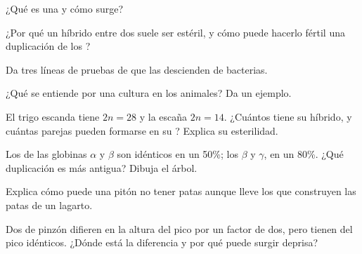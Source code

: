 \begin{exercise}[$\star$]\label{exo:g12:diversification-of-life:2}
¿Qué es una  y cómo surge?
\end{exercise}

\begin{exercise}[$\star$]\label{exo:g12:diversification-of-life:3}
¿Por qué un híbrido entre dos  suele ser estéril, y cómo puede
hacerlo fértil una duplicación de los ?
\end{exercise}

\begin{exercise}[$\star$]\label{exo:g12:diversification-of-life:4}
Da tres líneas de pruebas de que las  descienden de
bacterias.
\end{exercise}

\begin{exercise}[$\star$]\label{exo:g12:diversification-of-life:5}
¿Qué se entiende por una cultura en los animales? Da un ejemplo.
\end{exercise}

\begin{exercise}[$\star\star$]\label{exo:g12:diversification-of-life:6}
El trigo escanda tiene $2n = 28$ y la escaña $2n = 14$. ¿Cuántos
 tiene su híbrido, y cuántas parejas pueden formarse en su
? Explica su esterilidad.
\end{exercise}

\begin{exercise}[$\star\star$]\label{exo:g12:diversification-of-life:7}
Los  de las globinas $\alpha$ y $\beta$ son idénticos en un 50\%;
los  $\beta$ y $\gamma$, en un 80\%. ¿Qué duplicación es más
antigua? Dibuja el árbol.
\end{exercise}

\begin{exercise}[$\star\star$]\label{exo:g12:diversification-of-life:8}
Explica cómo puede una pitón no tener patas aunque lleve los  que
construyen las patas de un lagarto.
\end{exercise}

\begin{exercise}[$\star\star$]\label{exo:g12:diversification-of-life:9}
Dos  de pinzón difieren en la altura del pico por un factor de
dos, pero tienen  del pico idénticos. ¿Dónde está la diferencia y
por qué puede surgir deprisa?
\end{exercise}

